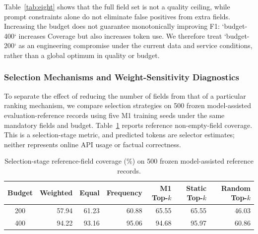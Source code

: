 \documentclass[runningheads]{llncs}
\newcommand{\method}{M1}
\begin{document}
\begin{table}[htbp]
\centering
\scriptsize
\setlength{\tabcolsep}{2pt}
\caption{Comparison of six internal methods on the 476-record shared-success subset of 500 model-assisted evaluation-reference records.}
\label{tab:eight}
\end{table}

Table~\ref{tab:eight} shows that the full field set is not a quality ceiling, while prompt constraints alone do not eliminate false positives from extra fields. Increasing the budget does not guarantee monotonically improving F1: `budget-400` increases Coverage but also increases token use. We therefore treat `budget-200` as an engineering compromise under the current data and service conditions, rather than a global optimum in quality or budget.

\subsubsection{Selection Mechanisms and Weight-Sensitivity Diagnostics}

To separate the effect of reducing the number of fields from that of a particular ranking mechanism, we compare selection strategies on 500 frozen model-assisted evaluation-reference records using five \method{} training seeds under the same mandatory fields and budget. Table~\ref{tab:selection-ablation} reports reference non-empty-field coverage. This is a selection-stage metric, and predicted tokens are selector estimates; neither represents online API usage or factual correctness.

\begin{table}[htbp]\centering\scriptsize\setlength{\tabcolsep}{3pt}
\caption{Selection-stage reference-field coverage (\%) on 500 frozen model-assisted reference records.}\label{tab:selection-ablation}
\begin{tabular}{@{}crrrrrr@{}}\toprule
Budget & Weighted & Equal & Frequency & \method{} Top-$k$ & Static Top-$k$ & Random Top-$k$\\\midrule
200 & 57.94 & 61.23 & 60.88 & 65.55 & 65.55 & 46.03\\
400 & 94.22 & 93.16 & 95.06 & 94.68 & 95.97 & 60.86\\\bottomrule
\end{tabular}\end{table}
\end{document}
